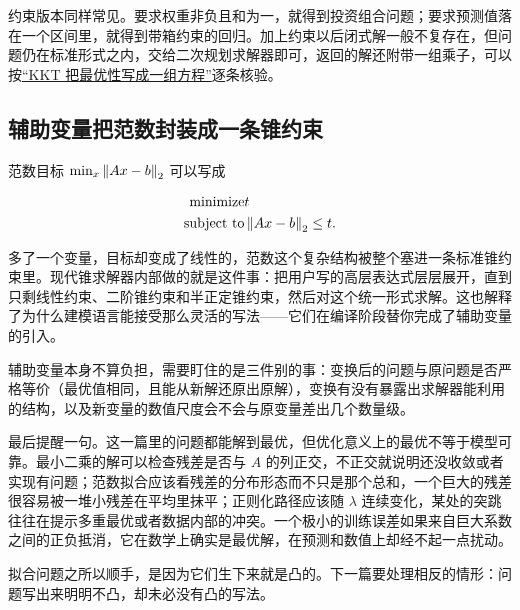 约束版本同样常见。要求权重非负且和为一，就得到投资组合问题；要求预测值落在一个区间里，就得到带箱约束的回归。加上约束以后闭式解一般不复存在，但问题仍在标准形式之内，交给二次规划求解器即可，返回的解还附带一组乘子，可以按\hyperref[sec:09-Convex-Optimization/05-Duality/03]{``KKT 把最优性写成一组方程''}逐条核验。

\subsection{辅助变量把范数封装成一条锥约束}

范数目标 \(\min_x\left\lVert Ax-b\right\rVert_2\) 可以写成

\[
\begin{aligned}
\text{minimize}\space&t\\
\text{subject to}\space&\left\lVert Ax-b\right\rVert_2\le t.
\end{aligned}
\]

多了一个变量，目标却变成了线性的，范数这个复杂结构被整个塞进一条标准锥约束里。现代锥求解器内部做的就是这件事：把用户写的高层表达式层层展开，直到只剩线性约束、二阶锥约束和半正定锥约束，然后对这个统一形式求解。这也解释了为什么建模语言能接受那么灵活的写法——它们在编译阶段替你完成了辅助变量的引入。

辅助变量本身不算负担，需要盯住的是三件别的事：变换后的问题与原问题是否严格等价（最优值相同，且能从新解还原出原解），变换有没有暴露出求解器能利用的结构，以及新变量的数值尺度会不会与原变量差出几个数量级。

最后提醒一句。这一篇里的问题都能解到最优，但优化意义上的最优不等于模型可靠。最小二乘的解可以检查残差是否与 \(A\) 的列正交，不正交就说明还没收敛或者实现有问题；范数拟合应该看残差的分布形态而不只是那个总和，一个巨大的残差很容易被一堆小残差在平均里抹平；正则化路径应该随 \(\lambda\) 连续变化，某处的突跳往往在提示多重最优或者数据内部的冲突。一个极小的训练误差如果来自巨大系数之间的正负抵消，它在数学上确实是最优解，在预测和数值上却经不起一点扰动。

拟合问题之所以顺手，是因为它们生下来就是凸的。下一篇要处理相反的情形：问题写出来明明不凸，却未必没有凸的写法。

